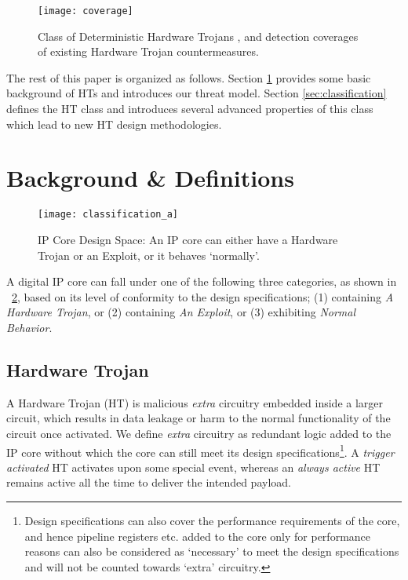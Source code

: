 \documentclass[10pt,journal,compsoc]{IEEEtran}
\begin{document}
\begin{figure}[!t]
\centering
\texttt{[image: coverage]}
\caption{Class of Deterministic Hardware Trojans , and detection coverages of existing Hardware Trojan countermeasures.}
\label{fig-coverage}
\end{figure}































The rest of this paper is organized as follows.
Section \ref{sec:background-org} provides some basic background of HTs and introduces our threat model.
Section \ref{sec:classification} defines the HT class  and introduces several advanced properties of this class which lead to new HT design methodologies.



 
\section{Background \& Definitions}\label{sec:background-org}

\begin{figure}[!t]
\centering
\texttt{[image: classification\_a]}
\caption{IP Core Design Space: An IP core can either have a Hardware Trojan or an Exploit, or it behaves `normally'.}
\label{fig:classification_a}
\end{figure}

A digital IP core can fall under one of the following three categories, as shown in \figurename~\ref{fig:classification_a}, based on its level of conformity to the design specifications; (1) containing \textit{A Hardware Trojan}, or (2) containing \textit{An Exploit}, or (3) exhibiting \textit{Normal Behavior}. 

\subsection{Hardware Trojan}
A Hardware Trojan (HT) is malicious \textit{extra} circuitry embedded inside a larger circuit, which results in data leakage or harm to the normal functionality of the circuit once activated.
We define \textit{extra} circuitry as redundant logic added to the IP core without which the core can still meet its design specifications\footnote{Design specifications can also cover the performance requirements of the core, and hence pipeline registers etc. added to the core only for performance reasons can also be considered as `necessary' to meet the design specifications and will not be counted towards `extra' circuitry.}.
A \textit{trigger activated} HT activates upon some special event, whereas an \textit{always active} HT remains active all the time to deliver the intended payload.
\end{document}
